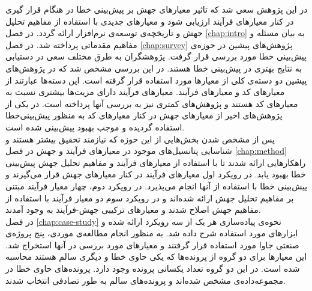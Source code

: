در این پژوهش سعی شد که تاثیر معیار‌های جهش بر پیش‌بینی خطا در هنگام قرار گیری در کنار معیار‌های فرآیند ارزیابی  شود و معیارهای جدیدی با استفاده از مفاهیم تحلیل جهش و تاریخچه‌ی توسعه‌ی نرم‌افزار ارائه گردد. در فصل \ref{chap:intro} به بیان مسئله و مفاهیم مقدماتی پرداخته شد. در فصل \ref{chap:survey}  پژوهش‌های پیشین در حوزه‌ی پیش‌بینی خطا مورد بررسی قرار گرفت. پژوهشگران به طرق مختلف سعی در دستیابی به نتایج بهتری در پیش‌بینی خطا هستند. در این بررسی مشخص شد که در پژوهش‌های پیشین دو دسته‌ی کلی از معیارها مورد استفاده قرار گرفته است. این دسته‌ها عبارتند از معیارهای کد و معیارهای فرآیند. معیارهای فرآیند دارای مزیت‌ها بیشتری نسبت به معیارهای کد هستند و پژوهش‌های کمتری نیز به بررسی آنها پرداخته است. در یکی از پژوهش‌های اخیر از معیارهای جهش  در کنار معیارهای کد به منظور پیش‌بینی‌خطا استفاده گردیده و موجب بهبود پیش‌بینی شده است. \\

پس از مشخص شدن بخش‌هایی از این حوزه که نیازمند تحقیق بیشتر هستند و شناسایی پتانسیل‌های موجود در معیارهای فرآیند و جهش در فصل \ref{chap:method} راهکارهایی ارائه شدند تا با استفاده از معیارهای فرآیند و مفاهیم تحلیل جهش پیش‌بینی خطا بهبود یابد. در رویکرد اول معیارهای فرآیند در کنار معیارهای جهش قرار می‌گیرند و پیش‌بینی خطا با استفاده از آنها انجام می‌پذیرد. در رویکرد دوم، چهار معیار فرآیند مبتنی بر مفاهیم تحلیل جهش ارائه شده‌اند و در رویکرد سوم دو معیار فرآیند با استفاده از مفاهیم جهش اصلاح شدند و معیارهای ترکیبی جهش-فرآیند به وجود آمدند. \\

در فصل \ref{chap:case-study}  نحوه‌ی پیاده‌سازی هر یک از سه رویکرد ارائه شده و ابزارهای مورد استفاده شرح داده شد. به منظور انجام مطالعه‌ی موردی، پنج پروژه‌ی صنعتی جاوا مورد استفاده قرار گرفتند و معیارهای مورد بررسی در آنها استخراج شد. این معیارها برای دو گروه از پرونده‌ها که یکی حاوی خطا و دیگری سالم هستند محاسبه شده است. در این دو گروه تعداد یکسانی پرونده وجود دارد. پرونده‌های حاوی خطا در مجموعه‌داده‌ی  مشخص شده‌اند و پرونده‌های سالم به طور تصادفی انتخاب شدند. \\

